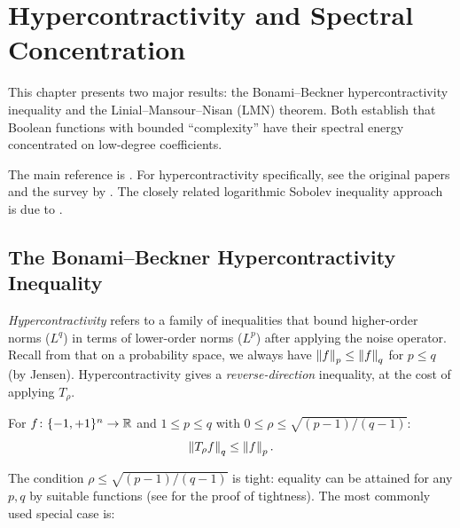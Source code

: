 
\chapter{Hypercontractivity and Spectral Concentration}\label{ch:concentration}

This chapter presents two major results: the Bonami--Beckner
hypercontractivity inequality and the Linial--Mansour--Nisan (LMN) theorem.
Both establish that Boolean functions with bounded ``complexity'' have
their spectral energy concentrated on low-degree coefficients.

The main reference is \citet[Chapters~9--10]{odonnell2014analysis}.
For hypercontractivity specifically, see the original papers
\citep{bonami1970etude,beckner1975inequalities} and the survey by
\citet{odonnell2007lecture}. The closely related logarithmic Sobolev
inequality approach is due to \citet{gross1975logarithmic}.

\section{The Bonami--Beckner Hypercontractivity Inequality}\label{sec:bonami-beckner}

\emph{Hypercontractivity} refers to a family of inequalities that bound
higher-order norms ($L^q$) in terms of lower-order norms ($L^p$) after
applying the noise operator. Recall from  that on a
probability space, we always have $\left\| f \right\|_p \leq \left\| f \right\|_q$ for
$p \leq q$ (by Jensen). Hypercontractivity gives a
\emph{reverse-direction} inequality, at the cost of applying $T_\rho$.

\begin{theorem}
\label{thm:bonami-beckner}
For $f \colon \{-1,+1\}^n \to \mathbb{R}$ and $1 \leq p \leq q$ with
$0 \leq \rho \leq \sqrt{(p-1)/(q-1)}$:
\begin{equation}\label{eq:bonami-beckner}
  \left\| T_\rho f \right\|_q \leq \left\| f \right\|_p.
\end{equation}
\end{theorem}

The condition $\rho \leq \sqrt{(p-1)/(q-1)}$ is tight: equality
can be attained for any $p, q$ by suitable functions (see
\citealp[Theorem~9.21]{odonnell2014analysis} for the proof of
tightness). The most commonly used special case is:

